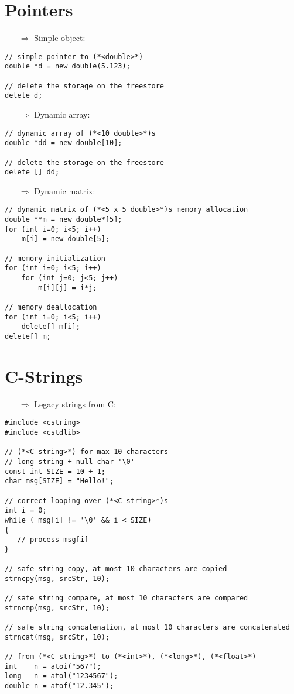 \documentclass[10pt]{article}
\begin{document}
\section{Pointers}
\small
\begin{enumerate}
\item[$\Rightarrow$] Simple object:
\end{enumerate}
\begin{lstlisting}
// simple pointer to (*<double>*)
double *d = new double(5.123);

// delete the storage on the freestore
delete d;
\end{lstlisting}
\begin{enumerate}
\item[$\Rightarrow$] Dynamic array:
\end{enumerate}
\begin{lstlisting}
// dynamic array of (*<10 double>*)s
double *dd = new double[10];

// delete the storage on the freestore
delete [] dd;
\end{lstlisting}
\begin{enumerate}
\item[$\Rightarrow$] Dynamic matrix:
\end{enumerate}
\begin{lstlisting}
// dynamic matrix of (*<5 x 5 double>*)s memory allocation
double **m = new double*[5];
for (int i=0; i<5; i++)
    m[i] = new double[5];

// memory initialization    
for (int i=0; i<5; i++)
    for (int j=0; j<5; j++)
        m[i][j] = i*j;

// memory deallocation
for (int i=0; i<5; i++)
    delete[] m[i];
delete[] m;
\end{lstlisting}
%
%
\section{C-Strings}
\small
\begin{enumerate}
\item[$\Rightarrow$] Legacy strings from C:
\end{enumerate}
\begin{lstlisting}
#include <cstring>
#include <cstdlib>

// (*<C-string>*) for max 10 characters
// long string + null char '\0'
const int SIZE = 10 + 1;
char msg[SIZE] = "Hello!";

// correct looping over (*<C-string>*)s
int i = 0;
while ( msg[i] != '\0' && i < SIZE)
{
   // process msg[i]
}

// safe string copy, at most 10 characters are copied
strncpy(msg, srcStr, 10);

// safe string compare, at most 10 characters are compared
strncmp(msg, srcStr, 10);

// safe string concatenation, at most 10 characters are concatenated
strncat(msg, srcStr, 10);

// from (*<C-string>*) to (*<int>*), (*<long>*), (*<float>*)
int    n = atoi("567");
long   n = atol("1234567");
double n = atof("12.345");
\end{lstlisting}
%
%
\end{document}
